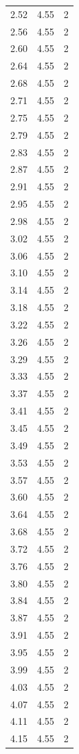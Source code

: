 \begin{longtable}{lrr}
  2.52 & 4.55 & 2 \\
  2.56 & 4.55 & 2 \\
  2.60 & 4.55 & 2 \\
  2.64 & 4.55 & 2 \\
  2.68 & 4.55 & 2 \\
  2.71 & 4.55 & 2 \\
  2.75 & 4.55 & 2 \\
  2.79 & 4.55 & 2 \\
  2.83 & 4.55 & 2 \\
  2.87 & 4.55 & 2 \\
  2.91 & 4.55 & 2 \\
  2.95 & 4.55 & 2 \\
  2.98 & 4.55 & 2 \\
  3.02 & 4.55 & 2 \\
  3.06 & 4.55 & 2 \\
  3.10 & 4.55 & 2 \\
  3.14 & 4.55 & 2 \\
  3.18 & 4.55 & 2 \\
  3.22 & 4.55 & 2 \\
  3.26 & 4.55 & 2 \\
  3.29 & 4.55 & 2 \\
  3.33 & 4.55 & 2 \\
  3.37 & 4.55 & 2 \\
  3.41 & 4.55 & 2 \\
  3.45 & 4.55 & 2 \\
  3.49 & 4.55 & 2 \\
  3.53 & 4.55 & 2 \\
  3.57 & 4.55 & 2 \\
  3.60 & 4.55 & 2 \\
  3.64 & 4.55 & 2 \\
  3.68 & 4.55 & 2 \\
  3.72 & 4.55 & 2 \\
  3.76 & 4.55 & 2 \\
  3.80 & 4.55 & 2 \\
  3.84 & 4.55 & 2 \\
  3.87 & 4.55 & 2 \\
  3.91 & 4.55 & 2 \\
  3.95 & 4.55 & 2 \\
  3.99 & 4.55 & 2 \\
  4.03 & 4.55 & 2 \\
  4.07 & 4.55 & 2 \\
  4.11 & 4.55 & 2 \\
  4.15 & 4.55 & 2 \\

\end{longtable}
